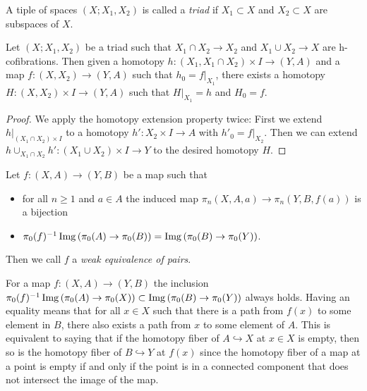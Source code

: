 \begin{definition}[Triad]
    A tiple of spaces $(X;X_1,X_2)$ is called a \emph{triad} if $X_1\subset X$ and $X_2\subset X$ are subspaces of $X$.
\end{definition}
\begin{lemma}
    Let $(X;X_1,X_2)$ be a triad such that $X_1\cap X_2\to X_2$ and $X_1\cup X_2\to X$ are h-cofibrations. 
    Then given a homotopy $h\colon(X_1,X_1\cap X_2)\times I\to(Y,A)$ and a map $f\colon(X,X_2)\to(Y,A)$ such that $h_0=f|_{X_1}$, there exists a homotopy $H\colon(X,X_2)\times I\to(Y,A)$ such that $H|_{X_1}=h$ and $H_0=f$.
    \begin{proof}
        We apply the homotopy extension property twice: First we extend $h|_{\left(X_1\cap X_2\right)\times I}$ to a homotopy $h'\colon X_2\times I\to A$ with $h'_0=f|_{X_2}$.
        Then we can extend $h\cup_{X_1\cap X_2} h'\colon \left(X_1\cup X_2\right)\times I\to Y$ to the desired homotopy $H$.
    \end{proof}
\end{lemma}
\begin{definition}\label{def:weOfPairs}
    Let $f\colon(X,A)\to (Y,B)$ be a map such that 
    \begin{itemize}
        \item for all $n\geq 1$ and $a\in A$ the induced map $\pi_n(X,A,a)\to\pi_n(Y,B,f(a))$ is a bijection
        \item $\pi_0(f)^{-1}\operatorname{Img}\left(\pi_0(A)\to\pi_0(B)\right)=\operatorname{Img}\left(\pi_0(B)\to\pi_0(Y)\right)$.
    \end{itemize}
    Then we call $f$ a \emph{weak equivalence of pairs}.
\end{definition}
\begin{remark}\label{rmk:emptyFiber}
    For a map $f\colon(X,A)\to (Y,B)$ the inclusion $\pi_0(f)^{-1}\operatorname{Img}\left(\pi_0(A)\to\pi_0(X)\right)\subset\operatorname{Img}\left(\pi_0(B)\to\pi_0(Y)\right)$ always holds.
    Having an equality means that for all $x\in X$ such that there is a path from $f(x)$ to some element in $B$, there also exists a path from $x$ to some element of $A$.
    This is equivalent to saying that if the homotopy fiber of $A\hookrightarrow X$ at $x\in X$ is empty, then so is the homotopy fiber of $B\hookrightarrow Y$ at $f(x)$ since the homotopy fiber of a map at a point is empty if and only if the point is in a connected component that does not intersect the image of the map.
\end{remark}
